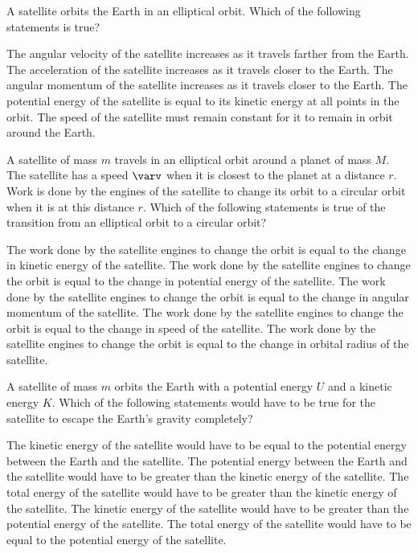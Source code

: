 \documentclass{../../oss-apphys-exam}
\begin{document}
\begin{questions}
\begin{multicols*}{2}
    \question A satellite orbits the Earth in an elliptical orbit. Which of the
    following statements is true?
    \begin{choices}
      \choice The angular velocity of the satellite increases as it travels
      farther from the Earth.
      \choice The acceleration of the satellite increases as it travels closer
      to the Earth.
      \choice The angular momentum of the satellite increases as it travels
      closer to the Earth.
      \choice The potential energy of the satellite is equal to its kinetic
      energy at all points in the orbit.
      \choice The speed of the satellite must remain constant for it to remain
      in orbit around the Earth.
    \end{choices}

    \question A satellite of mass $m$ travels in an elliptical orbit around a
    planet of mass $M$. The satellite has a speed $\varv$ when it is closest to
    the planet at a distance $r$. Work is done by the engines of the satellite
    to change its orbit to a circular orbit when it is at this distance $r$.
    Which of the following statements is true of the transition from an
    elliptical orbit to a circular orbit?
    \begin{choices}
      \choice The work done by the satellite engines to change the orbit is
      equal to the change in kinetic energy of the satellite.
      \choice The work done by the satellite engines to change the orbit is
      equal to the change in potential energy of the satellite.
      \choice The work done by the satellite engines to change the orbit is
      equal to the change in angular momentum of the satellite.
      \choice The work done by the satellite engines to change the orbit is
      equal to the change in speed of the satellite.
      \choice The work done by the satellite engines to change the orbit is
      equal to the change in orbital radius of the satellite.
    \end{choices}
    \columnbreak
    
    \question A satellite of mass $m$ orbits the Earth with a potential energy
    $U$ and a kinetic energy $K$. Which of the following statements would have
    to be true for the satellite to escape the Earth's gravity completely?
    \begin{choices}
      \choice The kinetic energy of the satellite would have to be equal to the
      potential energy between the Earth and the satellite.
      \choice The potential energy between the Earth and the satellite would
      have to be greater than the kinetic energy of the satellite.
      \choice The total energy of the satellite would have to be greater than
      the kinetic energy of the satellite.
      \choice The kinetic energy of the satellite would have to be greater than
      the potential energy of the satellite.
      \choice The total energy of the satellite would have to be equal to the
      potential energy of the satellite.
    \end{choices}
  \end{multicols*}
  \newpage


\end{questions}
\end{document}

